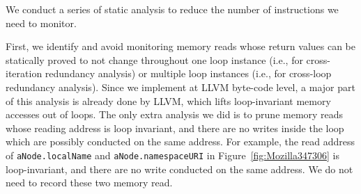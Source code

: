 We conduct a series of static analysis to reduce the number of instructions we 
need to monitor. 

First, we identify and avoid monitoring memory reads whose return values can be 
statically proved to
not change throughout one loop instance (i.e., for cross-iteration
redundancy analysis) or multiple loop instances (i.e., for cross-loop redundancy
analysis). Since we implement \Tool at LLVM byte-code level, a major part of this
analysis is already done by LLVM, which lifts loop-invariant memory
accesses out of loops. The only extra analysis we did is to 
prune memory reads whose reading address is loop invariant, and there are no writes 
inside the loop which are possibly conducted on the same address. 
For example, the read address of \texttt{aNode.localName} and \texttt{aNode.namespaceURI}
in Figure~\ref{fig:Mozilla347306} is loop-invariant, and there are no write conducted 
on the same address. We do not need to record these two memory read. 



